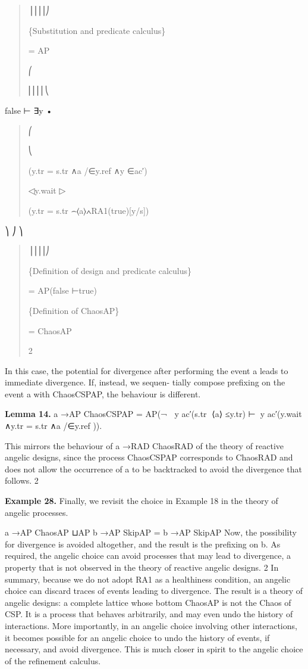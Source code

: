 \documentclass[11pt]{article}
\begin{document}
\begin{quote}\small\raggedright
⎟⎟⎟⎟⎠
\par
\{Substitution and predicate calculus\}
\par
= AP
\par
⎛
\par
⎜⎜⎜⎜⎝
\end{quote}

false ⊢ ∃y •

\begin{quote}\small\raggedright
⎛
\par
⎝
\par
(y.tr = s.tr ∧a /∈y.ref ∧y ∈ac′)
\par
◁y.wait ▷
\par
(y.tr = s.tr ⌢⟨a⟩∧RA1(true)[y/s])
\end{quote}

⎞ ⎠ ⎞

\begin{quote}\small\raggedright
⎟⎟⎟⎟⎠
\par
\{Definition of design and predicate calculus\}
\par
= AP(false ⊢true)
\par
\{Definition of ChaosAP\}
\par
= ChaosAP
\par
2
\end{quote}

In this case, the potential for divergence after performing the event a leads to immediate divergence. If, instead, we sequen- tially compose prefixing on the event a with ChaosCSPAP, the behaviour is different.

\noindent\textbf{Lemma 14.} a →AP ChaosCSPAP = AP(¬ ∈⃝y ac′(s.tr ⌢⟨a⟩ ≤y.tr) ⊢∈⃝y ac′(y.wait ∧y.tr = s.tr ∧a /∈y.ref )).


This mirrors the behaviour of a →RAD ChaosRAD of the theory of reactive angelic designs, since the process ChaosCSPAP corresponds to ChaosRAD and does not allow the occurrence of a to be backtracked to avoid the divergence that follows. 2

\noindent\textbf{Example 28.} Finally, we revisit the choice in Example 18 in the theory of angelic processes.


a →AP ChaosAP ⊔AP b →AP SkipAP = b →AP SkipAP Now, the possibility for divergence is avoided altogether, and the result is the prefixing on b. As required, the angelic choice can avoid processes that may lead to divergence, a property that is not observed in the theory of reactive angelic designs. 2 In summary, because we do not adopt RA1 as a healthiness condition, an angelic choice can discard traces of events leading to divergence. The result is a theory of angelic designs: a complete lattice whose bottom ChaosAP is not the Chaos of CSP. It is a process that behaves arbitrarily, and may even undo the history of interactions. More importantly, in an angelic choice involving other interactions, it becomes possible for an angelic choice to undo the history of events, if necessary, and avoid divergence. This is much closer in spirit to the angelic choice of the refinement calculus.
\end{document}
